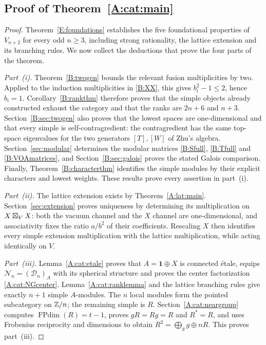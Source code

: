 \documentclass[11pt]{article}
\newcommand{\one}{\mathbf1}\newcommand{\D}{\mathcal D}\newcommand{\Dcat}{\mathcal D}
\newcommand{\Ncat}{\mathcal N}\newcommand{\Pcat}{\mathcal P}\newcommand{\Fcat}{\mathcal F}
\newcommand{\FP}{\operatorname{FPdim}}\newcommand{\Irr}{\operatorname{Irr}}
\numberwithin{equation}{section}
\begin{document}
\subsection{Proof of Theorem~\ref{A:cat:main}}\label{A:cat:proof-main}
\begin{proof}
Theorem~\ref{E:foundations} establishes the five foundational properties of $V_{n+2}$ for every odd $n\geq3$, including strong rationality, the lattice extension and its branching rules. We now collect the deductions that prove the four parts of the theorem.

\emph{Part~\textup{(i)}.} Theorem~\ref{B:twogen} bounds the relevant fusion multiplicities by two. Applied to the induction multiplicities in \eqref{B:XX}, this gives $b_i^2-1\leq2$, hence $b_i=1$. Corollary~\ref{B:rankthm} therefore proves that the simple objects already constructed exhaust the category and that the ranks are $2n+6$ and $n+3$. Section~\ref{B:sec:twogen} also proves that the lowest spaces are one-dimensional and that every simple is self-contragredient: the contragredient has the same top-space eigenvalues for the two generators $[T],[W]$ of Zhu's algebra. Section~\ref{sec:modular} determines the modular matrices \eqref{B:Sfull}, \eqref{B:Tfull} and \eqref{B:VOAmatrices}, and Section~\ref{B:sec:galois} proves the stated Galois comparison. Finally, Theorem~\ref{B:characterthm} identifies the simple modules by their explicit characters and lowest weights. These results prove every assertion in part~\textup{(i)}.

\emph{Part~\textup{(ii)}.} The lattice extension exists by Theorem~\ref{A:lat:main}. Section~\ref{sec:extension} proves uniqueness by determining its multiplication on $X\boxtimes_V X$: both the vacuum channel and the $X$ channel are one-dimensional, and associativity fixes the ratio $a/b^2$ of their coefficients. Rescaling $X$ then identifies every simple extension multiplication with the lattice multiplication, while acting identically on $V$.

\emph{Part~\textup{(iii)}.} Lemma~\ref{A:cat:etale} proves that $A=\one\oplus X$ is connected \'etale, equips $\Ncat_n=(\D_n)_A$ with its spherical structure and proves the center factorization \eqref{A:cat:NGcenter}. Lemma~\ref{A:cat:ranklemma} and the lattice branching rules give exactly $n+1$ simple $A$-modules. The $n$ local modules form the pointed subcategory on $\mathbb Z/n$; the remaining simple is $R$. Section~\ref{A:cat:neargroup} computes $\FP(R)=t-1$, proves $gR=Rg=R$ and $R^*=R$, and uses Frobenius reciprocity and dimensions to obtain $R^2=\bigoplus_g g\oplus nR$. This proves part~\textup{(iii)}.


\end{proof}
\end{document}
